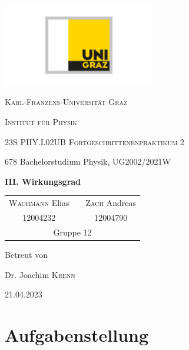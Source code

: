 \documentclass[english, ngerman]{scrartcl}
\begin{document}
\begin{titlepage}
    \centering
    \includegraphics[width=0.5\textwidth]{../../99_Misc/Logo_KF.pdf}\par\vspace{0.8cm}
    {\scshape\LARGE{Karl-Franzens-Universität Graz}\par}
    {\scshape\LARGE{Institut für Physik}\par}
    \vspace{1cm}
    {\scshape\Large{23S PHY.L02UB Fortgeschrittenenpraktikum 2}\par}
    678 Bachelorstudium Physik, UG2002/2021W\par
    \vspace{1.5cm}
    {\huge\bfseries III. Wirkungsgrad\par}
    \vspace{2cm}
    \begin{table}[H]
        \centering
        \begin{tabular}{c c c}
            \Large \textsc{Wachmann} Elias &  & \Large \textsc{Zach} Andreas \\
            \Large 12004232                &  & \Large 12004790              \\
            \multicolumn{3}{c}{Gruppe 12}
        \end{tabular}
    \end{table}
    \vfill
    \Large Betreut von\par
    Dr. Joachim \textsc{Krenn}
    \vfill
    {\large 21.04.2023\par}
\end{titlepage}

\clearpage
\tableofcontents
\newpage

\section[Aufgabenstellung]{Aufgabenstellung \cite{ref:angabe_solar,ref:angabe_waerme}}
\label{sec:aufgabenstellung}
\end{document}
